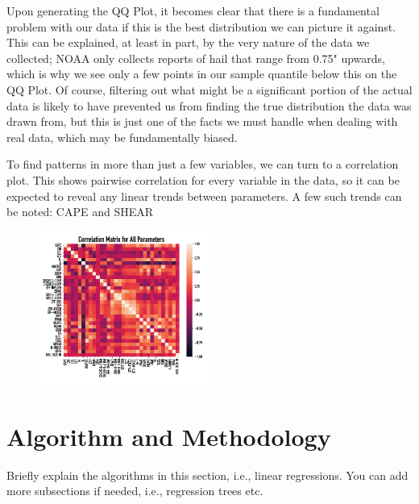 \documentclass[fleqn,10pt]{SelfArx} %
\begin{document}
Upon generating the QQ Plot, it becomes clear that there is a fundamental problem with our data if this is the best distribution we can picture it against. This can be explained, at least in part, by the very nature of the data we collected; NOAA only collects reports of hail that range from 0.75" upwards, which is why we see only a few points in our sample quantile below this on the QQ Plot. Of course, filtering out what might be a significant portion of the actual data is likely to have prevented us from finding the true distribution the data was drawn from, but this is just one of the facts we must handle when dealing with real data, which may be fundamentally biased.

To find patterns in more than just a few variables, we can turn to a correlation plot. This shows pairwise correlation for every variable in the data, so it can be expected to reveal any linear trends between parameters. A few such trends can be noted: CAPE and SHEAR 

\begin{figure}[H]
\includegraphics[width=0.5\textwidth, center=8.5cm]{"plots/all_corrs.png"} 
\end{figure}


\bigskip
\bigskip


\section{Algorithm and Methodology}

Briefly explain the algorithms in this section, i.e., linear regressions. You can add more subsections if needed, i.e., regression trees etc.


\bigskip
\bigskip
\end{document}
